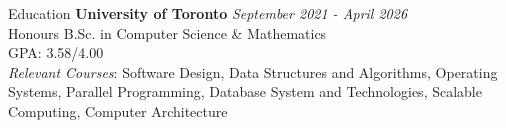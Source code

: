 \documentclass[
	11pt, %
]{resume} %
\begin{document}

\begin{rSection}{Education}
	\textbf{University of Toronto} \hfill \textit{September 2021 - April 2026} \\ 
	Honours B.Sc. in Computer Science \& Mathematics \\
	GPA: 3.58/4.00 \\[1pt]
	\textit{Relevant Courses}: Software Design, Data Structures and Algorithms, Operating Systems, Parallel Programming, Database System and Technologies, Scalable Computing, Computer Architecture
\end{rSection}

\end{document}
